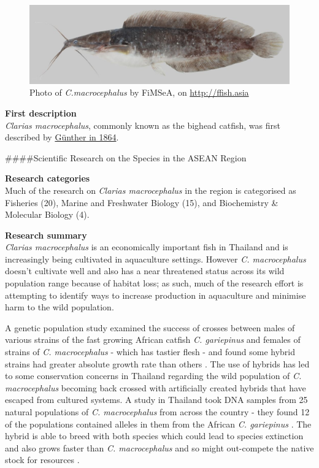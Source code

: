 \documentclass[]{book}
\theoremstyle{definition}
\theoremstyle{definition}
\theoremstyle{definition}
\theoremstyle{remark}
\begin{document}
\begin{figure}
\centering
\includegraphics{images_species/152_Clarias_macrocephalus_CTU-P00116.jpg}
\caption{Photo of \emph{C.macrocephalus} by FiMSeA, on
\url{http://ffish.asia}}
\end{figure}

\textbf{First description}\\
\emph{Clarias macrocephalus}, commonly known as the bighead catfish, was
first described by \href{https://www.gbif.org/species/5202728}{Günther
in 1864}.

\#\#\#\#Scientific Research on the Species in the ASEAN Region

\textbf{Research categories}\\
Much of the research on \emph{Clarias macrocephalus} in the region is
categorised as Fisheries (20), Marine and Freshwater Biology (15), and
Biochemistry \& Molecular Biology (4).

\textbf{Research summary}\\
\emph{Clarias macrocephalus} is an economically important fish in
Thailand and is increasingly being cultivated in aquaculture
settings\citep{Na_Nakorn_2004}. However \emph{C. macrocephalus} doesn't
cultivate well and also has a near threatened status across its wild
population range because of habitat loss; as such, much of the research
effort is attempting to identify ways to increase production in
aquaculture and minimise harm to the wild population.

A genetic population study examined the success of crosses between males
of various strains of the fast growing African catfish \emph{C.
gariepinus} and females of strains of \emph{C. macrocephalus} - which
has tastier flesh - and found some hybrid strains had greater absolute
growth rate than others \citep{Koolboon_2014}. The use of hybrids has
led to some conservation concerns in Thailand regarding the wild
population of \emph{C. macrocephalus} becoming back crossed with
artificially created hybrids that have escaped from cultured systems. A
study in Thailand took DNA samples from 25 natural populations of
\emph{C. macrocephalus} from across the country - they found 12 of the
populations contained alleles in them from the African \emph{C.
gariepinus} \citep{Na_Nakorn_2004}. The hybrid is able to breed with
both species which could lead to species extinction and also grows
faster than \emph{C. macrocephalus} and so might out-compete the native
stock for resources \citep{Na_Nakorn_2004}.
\end{document}
